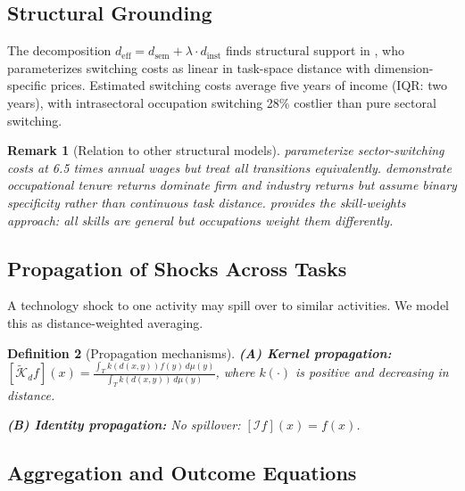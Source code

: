 \documentclass[12pt]{article}
\newtheorem{definition}{Definition}[section]
\newtheorem{remark}[definition]{Remark}
\begin{document}
\subsection{Structural Grounding}
\label{subsec:structural-grounding}


The decomposition $d_{\mathrm{eff}} = d_{\mathrm{sem}} + \lambda \cdot d_{\mathrm{inst}}$ finds structural support in \citet{Traiberman2019}, who parameterizes switching costs as linear in task-space distance with dimension-specific prices. Estimated switching costs average five years of income (IQR: two years), with intrasectoral occupation switching 28\% costlier than pure sectoral switching.

\begin{remark}[Relation to other structural models]
\label{rem:structural-comparison}
\citet{ArtucChaudhuriMcLaren2010} parameterize sector-switching costs at 6.5 times annual wages but treat all transitions equivalently. \citet{KambourovManovskii2009} demonstrate occupational tenure returns dominate firm and industry returns but assume binary specificity rather than continuous task distance. \citet{Lazear2009} provides the skill-weights approach: all skills are general but occupations weight them differently.
\end{remark}


\subsection{Propagation of Shocks Across Tasks}
\label{subsec:propagation}


A technology shock to one activity may spill over to similar activities. We model this as distance-weighted averaging.


\begin{definition}[Propagation mechanisms]
\label{def:propagation-mechanisms}
\textbf{(A) Kernel propagation:} 
$[\widetilde{\mathcal{K}}_d f](x) = \frac{\int_T k(d(x,y)) f(y)\, d\mu(y)}{\int_T k(d(x,y))\, d\mu(y)}$, where $k(\cdot)$ is positive and decreasing in distance.

\textbf{(B) Identity propagation:} No spillover: $[\mathcal{I} f](x) = f(x)$.
\end{definition}


\subsection{Aggregation and Outcome Equations}
\label{subsec:aggregation}
\end{document}
